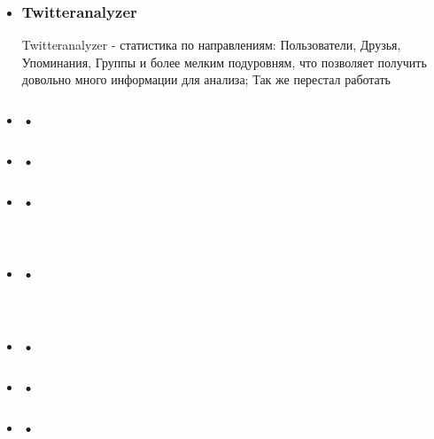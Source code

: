 \begin{chap1}
\begin{itemize}
\item \subsubsection{Twitteranalyzer}
Twitteranalyzer - статистика по  направлениям: Пользователи, Друзья, Упоминания, Группы и более мелким подуровням, что позволяет получить довольно много информации для анализа; Так же перестал работать
\item \subsubsection{•}
\item \subsubsection{•}
\item \subsubsection{•}\\
\item \subsubsection{•}\\
\item \subsubsection{•}
\item \subsubsection{•}
\item \subsubsection{•}


\end{itemize}
\end{chap1}
